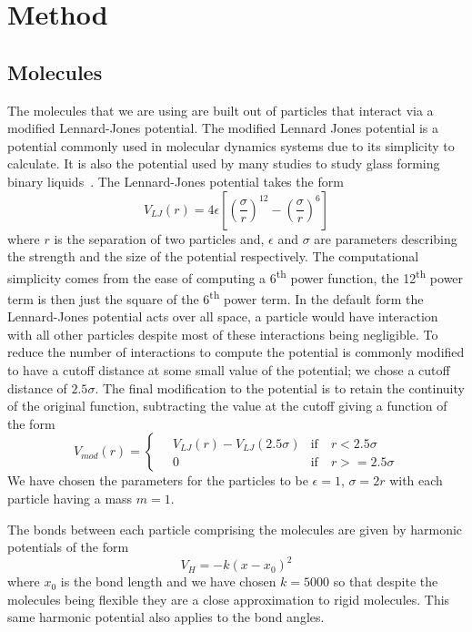 
\chapter{Method}

\section{Molecules}

The molecules that we are using are built out of particles that interact via a modified Lennard-Jones potential. The modified Lennard Jones potential is a potential commonly used in molecular dynamics systems due to its simplicity to calculate. It is also the potential used by many studies to study glass forming binary liquids~\cite{gotze:92,sciortino:99,glotzer:00,huer:08,royall:15}. The Lennard-Jones potential takes the form
\begin{equation}
    V_{LJ}(r) = 4\epsilon\left [ \left (\frac{\sigma}{r}\right )^{12} -\left ( \frac{\sigma}{r} \right )^6 \right]
\end{equation}
where $r$ is the separation of two particles and, $\epsilon$ and $\sigma$ are parameters describing the strength and the size of the potential respectively. The computational simplicity comes from the ease of computing a 6\textsuperscript{th} power function, the 12\textsuperscript{th} power term is then just the square of the 6\textsuperscript{th} power term. In the default form the Lennard-Jones potential acts over all space, a particle would have interaction with all other particles despite most of these interactions being negligible. To reduce the number of interactions to compute the potential is commonly modified to have a cutoff distance at some small value of the potential; we chose a cutoff distance of $2.5\sigma$. The final modification to the potential is to retain the continuity of the original function, subtracting the value at the cutoff giving a function of the form
\begin{equation}
    V_{mod}(r) = \begin{cases}
        \quad V_{LJ}(r) - V_{LJ}(2.5\sigma) & \text{if}\quad r < 2.5\sigma \\
        \quad 0  &\text{if}\quad r >= 2.5\sigma
    \end{cases}
\end{equation}
We have chosen the parameters for the particles to be $\epsilon = 1$, $\sigma = 2r$ with each particle having a mass $m=1$.

The bonds between each particle comprising the molecules are given by harmonic potentials of the form
\begin{equation}
    V_H = - k (x - x_0)^2
\end{equation}
where $x_0$ is the bond length and we have chosen $k = 5000$ so that despite the molecules being flexible they are a close approximation to rigid molecules. This same harmonic potential also applies to the bond angles.

